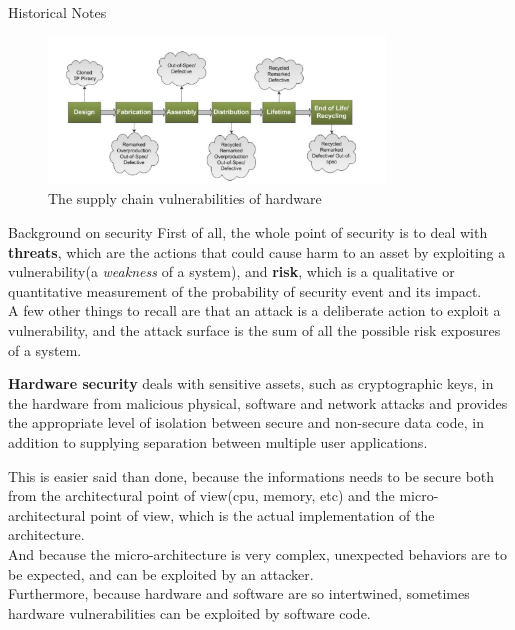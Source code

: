 \begin{section}{Historical Notes}
  \begin{figure}[H]
    \centering
    \includegraphics[width=0.8\textwidth]{img/hardware/supply chain vulnerabilies.png}
    \caption{The supply chain vulnerabilities of hardware}
  \end{figure}
\end{section}
\begin{section}{Background on security}
  First of all, the whole point of security is to deal with \textbf{threats}, which are the actions
  that could cause harm to an asset by exploiting a vulnerability(a \textit{weakness} of a system), 
  and \textbf{risk}, which is a qualitative or quantitative measurement of the probability of  
  security event and its impact.\\
  A few other things to recall are that an attack is a deliberate action to exploit a vulnerability,
  and the attack surface is the sum of all the possible risk exposures of a system.\\
  \begin{boxH}
    \textbf{Hardware security} deals with sensitive assets, such as cryptographic keys, in the 
    hardware from malicious physical, software and network attacks and provides the appropriate 
    level of isolation between secure and non-secure data code, in addition to supplying separation
    between multiple user applications.
  \end{boxH}
  This is easier said than done, because the informations needs to be secure both from the architectural
  point of view(cpu, memory, etc) and the micro-architectural point of view, which is the actual
  implementation of the architecture.\\
  And because the micro-architecture is very complex, unexpected behaviors are to be expected, and
  can be exploited by an attacker.\\
  Furthermore, because hardware and software are so intertwined, sometimes hardware vulnerabilities
  can be exploited by software code.\\


\end{section}
